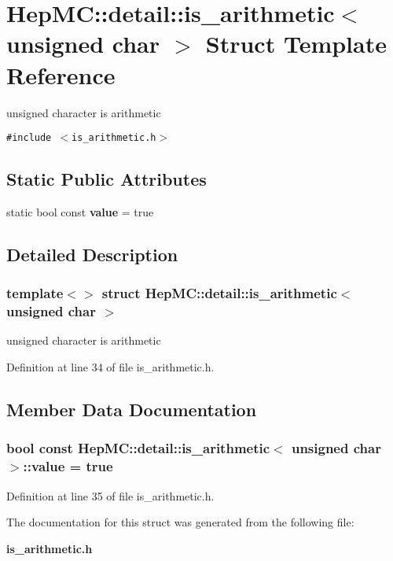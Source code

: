\section{Hep\-MC::detail::is\_\-arithmetic$<$ unsigned char $>$ Struct Template Reference}
\label{structHepMC_1_1detail_1_1is__arithmetic_3_01unsigned_01char_01_4}
unsigned character is arithmetic  


{\tt \#include $<$is\_\-arithmetic.h$>$}

\subsection*{Static Public Attributes}
\begin{CompactItemize}
\item 
static bool const {\bf value} = true
\end{CompactItemize}


\subsection{Detailed Description}
\subsubsection*{template$<$$>$ struct Hep\-MC::detail::is\_\-arithmetic$<$ unsigned char $>$}

unsigned character is arithmetic 



Definition at line 34 of file is\_\-arithmetic.h.

\subsection{Member Data Documentation}
\subsubsection{\setlength{\rightskip}{0pt plus 5cm}bool const {\bf Hep\-MC::detail::is\_\-arithmetic}$<$ unsigned char $>$::{\bf value} = true\hspace{0.3cm}{\tt  [static]}}\label{structHepMC_1_1detail_1_1is__arithmetic_3_01unsigned_01char_01_4_f0a8652f44c6b389fadd385f9e373c05}




Definition at line 35 of file is\_\-arithmetic.h.

The documentation for this struct was generated from the following file:\begin{CompactItemize}
\item 
{\bf is\_\-arithmetic.h}\end{CompactItemize}
